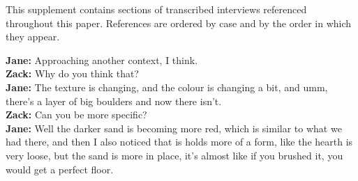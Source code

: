 This supplement contains sections of transcribed interviews referenced throughout this paper.
References are ordered by case and by the order in which they appear.

\begin{arefs}
\item\label{A1}
\textbf{Jane:} Approaching another context, I think.\\
\textbf{Zack:} Why do you think that?\\
\textbf{Jane:} The texture is changing, and the colour is changing a bit, and umm, there's a layer of big boulders and now there isn't.\\
\textbf{Zack:} Can you be more specific?\\
\textbf{Jane:} Well the darker sand is becoming more red, which is similar to what we had there, and then I also noticed that is holds more of a form, like the hearth is very loose, but the sand is more in place, it's almost like if you brushed it, you would get a perfect floor.


\end{arefs}
